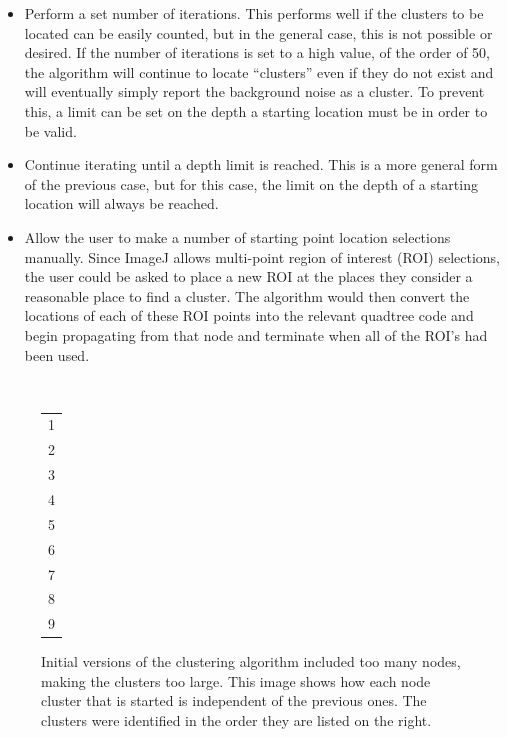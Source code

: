 \begin{itemize}

	\item Perform a set number of iterations. This performs well if the
		clusters to be located can be easily counted, but in the general case,
		this is not possible or desired. If the number of iterations is set to
		a high value, of the order of 50, the algorithm will continue to locate
		``clusters'' even if they do not exist and will eventually simply
		report the background noise as a cluster. To prevent this, a limit can
		be set on the depth a starting location must be in order to be valid.

	\item Continue iterating until a depth limit is reached. This is a more
		general form of the previous case, but for this case, the limit on the
		depth of a starting location will always be reached.

	\item Allow the user to make a number of starting point location selections
		manually. Since ImageJ allows multi-point region of interest (ROI)
		selections, the user could be asked to place a new ROI at the places
		they consider a reasonable place to find a cluster. The algorithm would
		then convert the locations of each of these ROI points into the
		relevant quadtree code and begin propagating from that node and
		terminate when all of the ROI's had been used.

\end{itemize}


\begin{figure}[tbhp]
	\centering
	\begin{minipage}[c]{7cm}
	\end{minipage}%
	\,
	\begin{minipage}[c]{1cm}
		\centering
		\begin{tabular}[b]{l}
			\cellcolor{lyellow}1 \\
			\cellcolor{lorange}2 \\
			\cellcolor{lbrown}3 \\
			\cellcolor{lgreen}4 \\
			\cellcolor{lblue}5 \\
			\cellcolor{lpurple}6 \\
			\cellcolor{lred}7 \\
			\cellcolor{silver}8 \\
			\cellcolor{lgrey}9 \\
		\end{tabular}
	\end{minipage}

	\caption[Propagation of multiple starting locations.]{Initial versions of
		the clustering algorithm included too many nodes, making the clusters
		too large. This image shows how each node cluster that is started is
		independent of the previous ones. The clusters were identified in the
		order they are listed on the right.}\label{fig:multiple-clusters-colours}
\end{figure}

